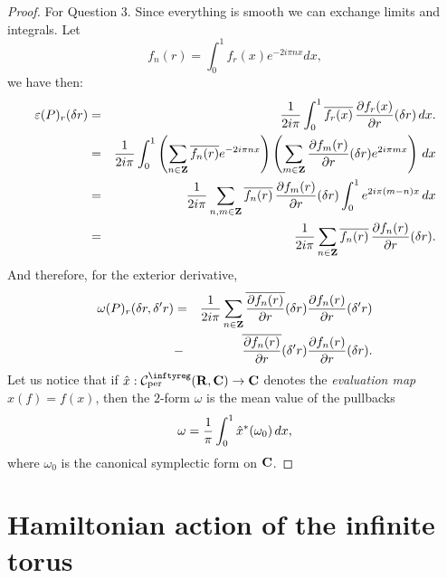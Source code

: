 \begin{proof}
  For Question 3. Since everything is smooth we can exchange limits and integrals. Let
  $$
    f_n(r) = \int_0^1 f_r(x) e^{-2i\pi n x} dx,
    $$
  we have then:
  \begin{eqnarray*}
    \varepsilon(P)_r(\delta r) & = & {1 \over 2i\pi} \int_0^1
    \overline{f_r(x)} \, {\partial f_r(x) \over \partial r}(\delta r) \, dx. \\
    &=& {1 \over 2i\pi} \int_0^1 \left(\sum_{n\in\mathbf{Z}} \overline{f_n(r)} e^{-2i\pi n x}\right)
    \left(\sum_{m\in\mathbf{Z}}{\partial f_m(r) \over \partial r}(\delta r) e^{2i\pi m x}\right)\, dx \\
    &=& {1 \over 2i\pi} \sum_{n,m\in\mathbf{Z}}\overline{f_n(r)}\, {\partial f_m(r) \over \partial r}(\delta r)
    \int_0^1 e^{2i\pi (m-n) x}\, dx \\
    &=& {1 \over 2i\pi}\sum_{n\in\mathbf{Z}} \overline{f_n(r)} \, {\partial f_n(r) \over \partial r}(\delta r).
  \end{eqnarray*}
  And therefore, for the exterior derivative,
  \begin{eqnarray*}
    \omega(P)_r(\delta r, \delta'r) &=& {1 \over 2i\pi}\sum_{n\in\mathbf{Z}} \overline{\partial f_n(r) \over \partial r}(\delta r)
    {\partial f_n(r) \over \partial r}(\delta'r) \\
    & - & \overline{\partial f_n(r) \over \partial r}(\delta'r)
    {\partial f_n(r) \over \partial r}(\delta r).
  \end{eqnarray*}
  Let us notice that if $\hat x : \Cinfty_{\rm per}(\RR,\CC) \to \CC$
  denotes the {\em evaluation map} $\hat x(f) = f(x)$, then the $2$-form
  $\omega$ is the mean value of the pullbacks
  $$
    \omega = {1\over \pi}\int_0^1 \hat x^*(\omega_0) \, dx,
    $$
  where $\omega_0$ is the canonical symplectic form on $\mathbf{C}$.
\end{proof}

\section{Hamiltonian action of the infinite torus}


